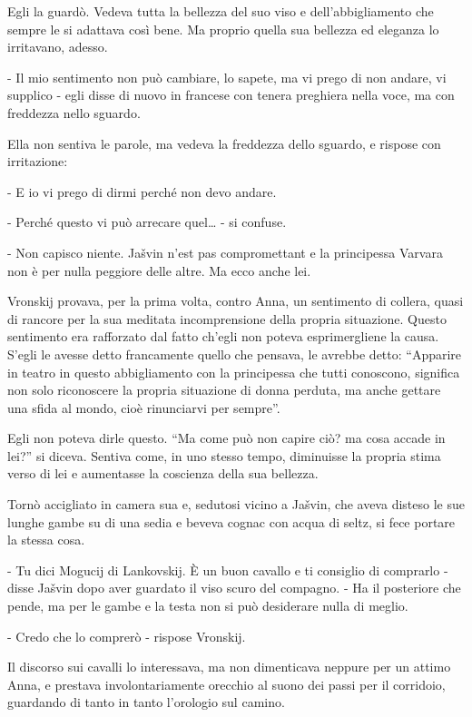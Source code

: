 Egli la guardò. Vedeva tutta la bellezza del suo viso e dell'abbigliamento che sempre le si adattava così bene. Ma proprio quella sua bellezza ed eleganza lo irritavano, adesso. 

- Il mio sentimento non può cambiare, lo sapete, ma vi prego di non andare, vi supplico - egli disse di nuovo in francese con tenera preghiera nella voce, ma con freddezza nello sguardo. 

Ella non sentiva le parole, ma vedeva la freddezza dello sguardo, e rispose con irritazione: 

- E io vi prego di dirmi perché non devo andare. 

- Perché questo vi può arrecare quel\ldots{} - si confuse. 

- Non capisco niente. Jašvin n'est pas compromettant e la principessa Varvara non è per nulla peggiore delle altre. Ma ecco anche lei. 

\label{xxxiii-2} 

Vronskij provava, per la prima volta, contro Anna, un sentimento di collera, quasi di rancore per la sua meditata incomprensione della propria situazione. Questo sentimento era rafforzato dal fatto ch'egli non poteva esprimergliene la causa. S'egli le avesse detto francamente quello che pensava, le avrebbe detto: ``Apparire in teatro in questo abbigliamento con la principessa che tutti conoscono, significa non solo riconoscere la propria situazione di donna perduta, ma anche gettare una sfida al mondo, cioè rinunciarvi per sempre''. 

Egli non poteva dirle questo. ``Ma come può non capire ciò? ma cosa accade in lei?'' si diceva. Sentiva come, in uno stesso tempo, diminuisse la propria stima verso di lei e aumentasse la coscienza della sua bellezza. 

Tornò accigliato in camera sua e, sedutosi vicino a Jašvin, che aveva disteso le sue lunghe gambe su di una sedia e beveva cognac con acqua di seltz, si fece portare la stessa cosa. 

- Tu dici Mogucij di Lankovskij. È un buon cavallo e ti consiglio di comprarlo - disse Jašvin dopo aver guardato il viso scuro del compagno. - Ha il posteriore che pende, ma per le gambe e la testa non si può desiderare nulla di meglio. 

- Credo che lo comprerò - rispose Vronskij. 

Il discorso sui cavalli lo interessava, ma non dimenticava neppure per un attimo Anna, e prestava involontariamente orecchio al suono dei passi per il corridoio, guardando di tanto in tanto l'orologio sul camino. 

